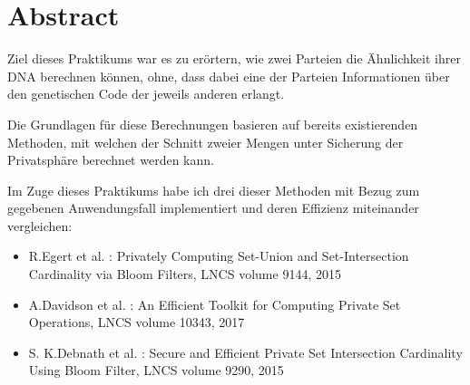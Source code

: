 \chapter*{Abstract}


Ziel dieses Praktikums war es zu erörtern, wie zwei Parteien die Ähnlichkeit ihrer DNA  berechnen können, ohne, dass dabei eine der Parteien Informationen über den genetischen Code der jeweils anderen erlangt.

Die Grundlagen für diese Berechnungen basieren auf bereits existierenden Methoden, mit welchen der Schnitt zweier Mengen unter Sicherung der Privatsphäre berechnet werden kann.

Im Zuge dieses Praktikums habe ich drei dieser Methoden mit Bezug zum gegebenen Anwendungsfall implementiert und deren Effizienz miteinander vergleichen:


\begin{itemize}
	\item R.Egert et al. : Privately Computing Set-Union and Set-Intersection Cardinality via Bloom Filters, LNCS volume 9144, 2015
	\item A.Davidson et al. : An Efficient Toolkit for Computing Private Set Operations, LNCS volume 10343, 2017
	\item S. K.Debnath et al. : Secure and Efficient Private Set Intersection Cardinality Using Bloom Filter, LNCS volume 9290, 2015
\end{itemize}
